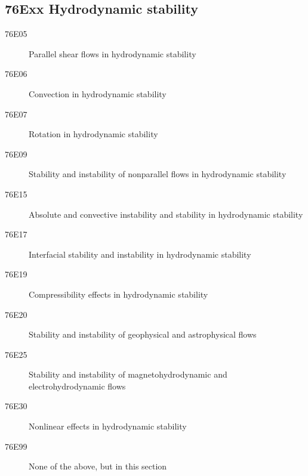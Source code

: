 \documentclass[letterpaper]{article}
\begin{document}
\subsection*{76Exx  Hydrodynamic stability }\label{76Exx}
\begin{description}  
\item [76E05]\label{76E05} Parallel shear flows in hydrodynamic stability
\item [76E06]\label{76E06} Convection in hydrodynamic stability
\item [76E07]\label{76E07} Rotation in hydrodynamic stability
\item [76E09]\label{76E09} Stability and instability of nonparallel flows in hydrodynamic stability
\item [76E15]\label{76E15} Absolute and convective instability and stability in hydrodynamic stability
\item [76E17]\label{76E17} Interfacial stability and instability in hydrodynamic stability
\item [76E19]\label{76E19} Compressibility effects in hydrodynamic stability
\item [76E20]\label{76E20} Stability and instability of geophysical and astrophysical flows
\item [76E25]\label{76E25} Stability and instability of magnetohydrodynamic and electrohydrodynamic flows
\item [76E30]\label{76E30} Nonlinear effects in hydrodynamic stability
\item [76E99]\label{76E99} None of the above, but in this section
\end{description}
\end{document}
